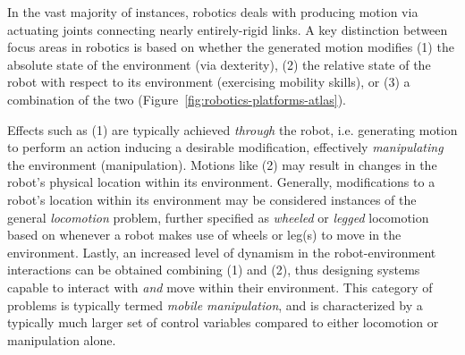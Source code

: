 In the vast majority of instances, robotics deals with producing motion via actuating joints connecting nearly entirely-rigid links.
A key distinction between focus areas in robotics is based on whether the generated motion modifies (1) the absolute state of the environment (via dexterity), (2) the relative state of the robot with respect to its environment (exercising mobility skills), or (3) a combination of the two (Figure~\ref{fig:robotics-platforms-atlas}).

Effects such as (1) are typically achieved \emph{through} the robot, i.e. generating motion to perform an action inducing a desirable modification, effectively \emph{manipulating} the environment (manipulation).
Motions like (2) may result in changes in the robot's physical location within its environment.
Generally, modifications to a robot's location within its environment may be considered instances of the general \emph{locomotion} problem, further specified as \emph{wheeled} or \emph{legged} locomotion based on whenever a robot makes use of wheels or leg(s) to move in the environment.
Lastly, an increased level of dynamism in the robot-environment interactions can be obtained combining (1) and (2), thus designing systems capable to interact with \emph{and} move within their environment.
This category of problems is typically termed \emph{mobile manipulation}, and is characterized by a typically much larger set of control variables compared to either locomotion or manipulation alone.

